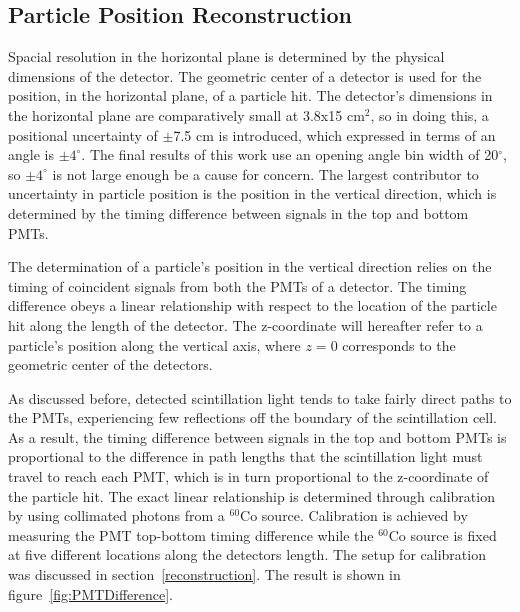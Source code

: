 \subsection{Particle Position Reconstruction}
Spacial resolution in the horizontal plane is determined by the physical dimensions of the detector.
The geometric center of a detector is used for the position, in the horizontal plane, of a particle hit.
The detector's dimensions in the horizontal plane are comparatively small at 3.8x15 cm$^2$, so in doing this, a positional uncertainty of $\pm$7.5 cm is introduced, which expressed in terms of an angle is $\pm4^{\circ}$.
The final results of this work use an opening angle bin width of 20$^{\circ}$, so $\pm4^{\circ}$ is not large enough be a cause for concern.
The largest contributor to uncertainty in particle position is the position in the vertical direction, which is determined by the timing difference between signals in the top and bottom PMTs.

The determination of a particle's position in the vertical direction relies on the timing of coincident signals from both the PMTs of a detector.
The timing difference obeys a linear relationship with respect to the location of the particle hit along the length of the detector.
The z-coordinate will hereafter refer to a particle's position along the vertical axis, where $z=0$ corresponds to the geometric center of the detectors.

As discussed before, detected scintillation light tends to take fairly direct paths to the PMTs, experiencing few reflections off the boundary of the scintillation cell.
As a result, the timing difference between signals in the top and bottom PMTs is proportional to the difference in path lengths that the scintillation light must travel to reach each PMT, which is in turn proportional to the z-coordinate of the particle hit.
The exact linear relationship is determined through calibration by using collimated photons from a $^{60}$Co source.
Calibration is achieved by measuring the PMT top-bottom timing difference while the $^{60}$Co source is fixed at five different locations along the detectors length.
The setup for calibration was discussed in section~\ref{reconstruction}.
The result is shown in figure~\ref{fig:PMTDifference}.

